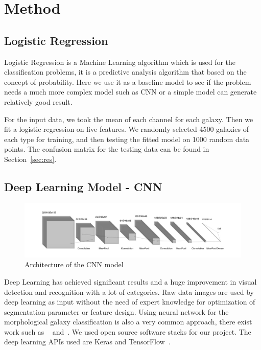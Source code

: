 \section{Method}
\label{sec:method}
\subsection{Logistic Regression}
\label{sec:log}
Logistic Regression is a Machine Learning algorithm which is used for the classification problems, it is a predictive analysis algorithm that based on the concept of probability. Here we use it as a baseline model to see if the problem needs a much more complex model such as CNN or a simple model can generate relatively good result. 

For the input data, we took the mean of each channel for each galaxy. Then we fit a logistic regression on five features. We randomly selected 4500 galaxies of each type for training, and then testing the fitted model on 1000 random data points. The confusion matrix for the testing data can be found in Section~\ref{sec:res}.

\subsection{Deep Learning Model - CNN}
\label{sec:cnn}
\begin{figure}[h]
	\centering
	\captionsetup{justification=centering}
	\includegraphics[width=\columnwidth]{Figures/CNNArchitecture.jpg}
	\caption{Architecture of the CNN model}
	\label{fig:cnnarch}
\end{figure}

Deep Learning has achieved significant results and a huge improvement in visual detection and recognition with a lot of categories. Raw data images are used by deep learning as input without the need of expert knowledge for optimization of segmentation parameter or feature design. Using neural network for the morphological galaxy classification is also a very common approach, there exist work such as ~\cite{banerji2010galaxy} and~\cite{khan2019deep}. 
We used open source software stacks for our project. The deep learning APIs used are Keras and TensorFlow~\cite{tensorflow}. 

